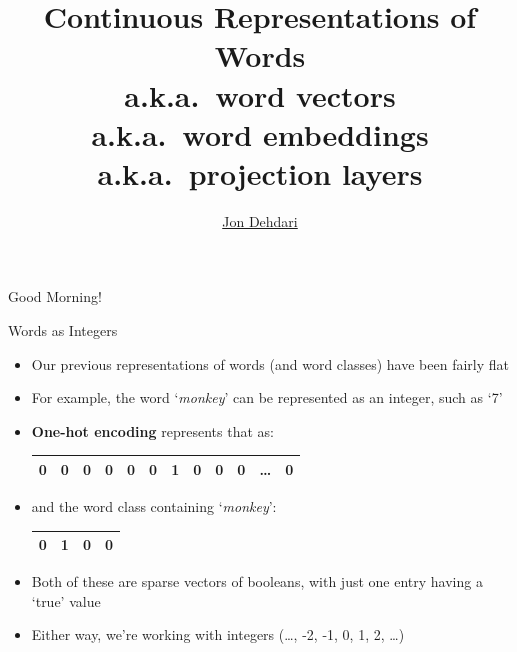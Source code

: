 \documentclass[xcolor=pdftex,x11names,table,hyperref]{beamer}
\begin{document}
\title{Continuous Representations of Words \\[1.5em]
	\small{a.k.a.\ word vectors \\
		a.k.a.\ word embeddings \\
		a.k.a.\ projection layers \\
	}
 }
\author{\href{http://jon.dehdari.org}{Jon Dehdari}}
\frame{\titlepage}

\begin{frame}{Good Morning!}
	\begin{center}
	\end{center}
\end{frame}

\begin{frame}{Words as Integers}
\begin{itemize}
	\item Our previous representations of words (and word classes) have been fairly flat
	\item For example, the word `\textit{monkey}' can be represented as an integer, such as `7'
	\pause
	\item \textbf{One-hot encoding} represents that as: \\[0.4em]
		\begin{tabular}{|c|c|c|c|c|c|c|c|c|c|c|c|}
		    \hline
			0 & 0 & 0 & 0 & 0 & 0 & 1 & 0 & 0 & 0 & \ldots & 0 \\
		    \hline
		\end{tabular}
	\pause

	\item and the word class containing `\textit{monkey}': \\[0.4em]
		\begin{tabular}{|c|c|c|c|}
		    \hline
			0 & 1 & 0 & 0 \\
		    \hline
		\end{tabular}

	\pause
	\item Both of these are sparse vectors of booleans, with just one entry having a `true' value
	\pause
	\item Either way, we're working with integers {\small (\ldots, -2, -1, 0, 1, 2, \ldots)}
\end{itemize}
\end{frame}
\end{document}
